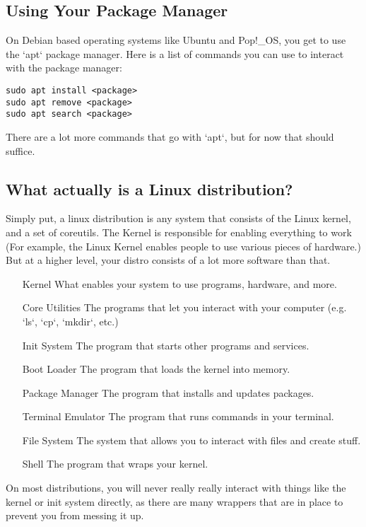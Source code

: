 \documentclass {report}
\begin{document}
\subsection{Using Your Package Manager}
On Debian based operating systems like Ubuntu and Pop!\_OS, you get to use the `apt` package manager. Here is a list of commands you can use to interact with the package manager:
\begin{lstlisting}
sudo apt install <package>
sudo apt remove <package>
sudo apt search <package>
\end{lstlisting}

There are a lot more commands that go with `apt`, but for now that should suffice.

\subsection{What actually is a Linux distribution?}
Simply put, a linux distribution is any system that consists of the Linux kernel, and a set of coreutils. The Kernel is responsible for enabling everything to work (For example, the Linux Kernel enables people to use various pieces of hardware.) But at a higher level, your distro consists of a lot more software than that.

\begin{enumerate}
  \item [Kernel] What enables your system to use programs, hardware, and more.
  \item [Core Utilities] The programs that let you interact with your computer (e.g. `ls`, `cp`, `mkdir`, etc.)
  \item [Init System] The program that starts other programs and services.
  \item [Boot Loader] The program that loads the kernel into memory.
  \item [Package Manager] The program that installs and updates packages.
  \item [Terminal Emulator] The program that runs commands in your terminal.
  \item [File System] The system that allows you to interact with files and create stuff.
  \item [Shell] The program that wraps your kernel.
\end{enumerate}

On most distributions, you will never really really interact with things like the kernel or init system directly, as there are many wrappers that are in place to prevent you from messing it up.
\end{document}
